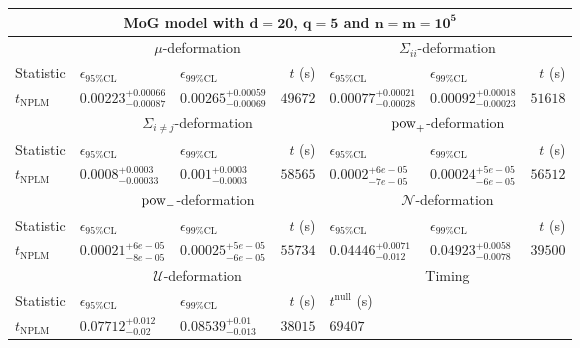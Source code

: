\begin{tabular}{l|llr|llr}
	\toprule
	\multicolumn{7}{c}{{\bf MoG model with $\mathbf{d=20}$, $\mathbf{q=5}$ and $\mathbf{n=m=10^{5}}$}} \\
	\toprule
	\multicolumn{1}{c}{} & \multicolumn{3}{c}{$\mu$-deformation} & \multicolumn{3}{c}{$\Sigma_{ii}$-deformation} \\
	Statistic & $\epsilon_{95\%\mathrm{CL}}$ & $\epsilon_{99\%\mathrm{CL}}$ & $t$ (s) & $\epsilon_{95\%\mathrm{CL}}$ & $\epsilon_{99\%\mathrm{CL}}$ & $t$ (s) \\
	\midrule
	$t_{\mathrm{NPLM}}$ & $0.00223_{-0.00087}^{+0.00066}$ & $0.00265_{-0.00069}^{+0.00059}$ & $49672$ & $0.00077_{-0.00028}^{+0.00021}$ & $0.00092_{-0.00023}^{+0.00018}$ & $51618$ \\
	\toprule
	\multicolumn{1}{c}{} & \multicolumn{3}{c}{$\Sigma_{i\neq j}$-deformation} & \multicolumn{3}{c}{$\rm{pow}_{+}$-deformation} \\
	Statistic & $\epsilon_{95\%\mathrm{CL}}$ & $\epsilon_{99\%\mathrm{CL}}$ & $t$ (s) & $\epsilon_{95\%\mathrm{CL}}$ & $\epsilon_{99\%\mathrm{CL}}$ & $t$ (s) \\
	\midrule
	$t_{\mathrm{NPLM}}$ & $0.0008_{-0.00033}^{+0.0003}$ & $0.001_{-0.0003}^{+0.0003}$ & $58565$ & $0.0002_{-7e-05}^{+6e-05}$ & $0.00024_{-6e-05}^{+5e-05}$ & $56512$ \\
	\toprule
	\multicolumn{1}{c}{} & \multicolumn{3}{c}{$\rm{pow}_{-}$-deformation} & \multicolumn{3}{c}{$\mathcal{N}$-deformation} \\
	Statistic & $\epsilon_{95\%\mathrm{CL}}$ & $\epsilon_{99\%\mathrm{CL}}$ & $t$ (s) & $\epsilon_{95\%\mathrm{CL}}$ & $\epsilon_{99\%\mathrm{CL}}$ & $t$ (s) \\
	\midrule
	$t_{\mathrm{NPLM}}$ & $0.00021_{-8e-05}^{+6e-05}$ & $0.00025_{-6e-05}^{+5e-05}$ & $55734$ & $0.04446_{-0.012}^{+0.0071}$ & $0.04923_{-0.0078}^{+0.0058}$ & $39500$ \\
	\toprule
	\multicolumn{1}{c}{} & \multicolumn{3}{c}{$\mathcal{U}$-deformation} & \multicolumn{3}{c}{Timing} \\
	Statistic & $\epsilon_{95\%\mathrm{CL}}$ & $\epsilon_{99\%\mathrm{CL}}$ & $t$ (s) & $t^{\mathrm{null}}$ (s) \\
	\midrule
	$t_{\mathrm{NPLM}}$ & $0.07712_{-0.02}^{+0.012}$ & $0.08539_{-0.013}^{+0.01}$ & $38015$ & $69407$ \\
	\bottomrule
\end{tabular}